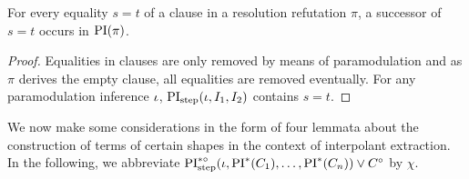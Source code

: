 \documentclass[,%
	draft=false,%
	numbers=noendperiod
	12pt,
	a4paper,
	oneside,%
	openany,
]{memoir}
\newcommand{\inv}{\ensuremath{\chi}}
\begin{document}
\begin{lemma}
	\label{lemma:equalities_all_in_PI}
	For every equality $s=t$ of a clause in a resolution refutation $\pi$,
	a successor of $s=t$ occurs in $\operatorname{PI}(\pi)$.
\end{lemma}
\begin{proof}
	Equalities in clauses are only removed by means of paramodulation and as $\pi$ derives the empty clause, all equalities are removed eventually.
	For any paramodulation inference $\iota$, $\operatorname{PI}_{\mathrm{step}}(\iota, I_1, I_2)$ contains $s=t$.
\end{proof}


We now make some considerations in the form of four lemmata about the construction of terms of certain shapes in the context of interpolant extraction.
In the following, we abbreviate $\operatorname{PI}^{*\circ}_{\mathrm{step}}(\iota, \operatorname{PI}^*(C_1), \dots, \operatorname{PI}^*(C_n)) \lor C^\circ$ by $\inv$.
\end{document}
